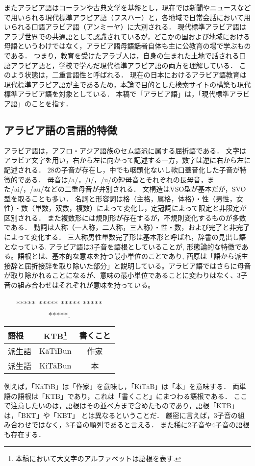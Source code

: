 \documentclass[technicalreport]{ieicej}
\begin{document}
またアラビア語はコーランや古典文学を基盤とし，現在では新聞やニュースなどで用いられる現代標準アラビア語（フスハー）と，各地域で日常会話において用いられる口語アラビア語（アンミーヤ）に大別される．
現代標準アラビア語はアラブ世界での共通語として認識されているが，どこかの国および地域における母語というわけではなく，アラビア語母語話者自体も主に公教育の場で学ぶものである．
つまり，教育を受けたアラブ人は，自身の生まれた土地で話される口語アラビア語と，学校で学んだ現代標準アラビア語の両方を理解している．
このよう状態は，二重言語性と呼ばれる．
現在の日本におけるアラビア語教育は現代標準アラビア語が主であるため，本論で目的とした検索サイトの構築も現代標準アラビア語を対象としている．
本稿で「アラビア語」は，「現代標準アラビア語」のことを指す．

\subsection{アラビア語の言語的特徴}
アラビア語は，アフロ・アジア語族のセム語派に属する屈折語である．
文字はアラビア文字を用い，右から左に向かって記述する一方，数字は逆に右から左に記述される．
28の子音が存在し，中でも咽頭化ないし軟口蓋音化した子音が特徴的である．
母音は/a/，/i/，/u/の短母音とそれぞれの長母音，また/ai/，/au/などの二重母音が弁別される．
文構造はVSO型が基本だが，SVO型を取ることも多い．
名詞と形容詞は格（主格，属格，体格）・性（男性，女性）・数（単数，双数，複数）によって変化し，定冠詞によって限定と非限定が区別される．
また複数形には規則形が存在するが，不規則変化するものが多数である．
動詞は人称（一人称，二人称，三人称）・性・数，および完了と非完了によって変化する．
三人称男性単数完了形は基本形と呼ばれ，辞書の見出し語となっている.
アラビア語は3子音を語根としていることが, 形態論的な特徴である。語根とは、基本的な意味を持つ最小単位のことであり, 西原は「語から派生接辞と屈折接辞を取り除いた部分」と説明している。アラビア語ではさらに母音が取り除かれることになるが、意味の最小単位であることに変わりはなく、3子音の組み合わせはそれぞれが意味を持っている。
\begin{table}[ht]
\begin{center}
\begin{tabular}{l|cc}
   語根& KTB\footnote{本稿において大文字のアルファベットは語根を表す.} & 書くこと\\
  \hline
 派生語& KāTiBun & 作家\\
  派生語& KiTāBun & 本\\
\hline
\end{tabular}
\caption{***** ***** ***** ***** *****.}
\label{table:alignment}
\end{center}
\end{table}
例えば，「KāTiB」は「作家」を意味し，「KiTāB」は「本」を意味する．
両単語の語根は「KTB」であり，これは「書くこと」にまつわる語根である．
ここで注意したいのは，語根はその並べ方まで含めたものであり，語根「KTB」は，「BKT」や「KBT」 とは異なるということだ．
厳密に言えば，3子音の組み合わせではなく，3子音の順列であると言える．
また稀に2子音や4子音の語根も存在する．
\end{document}
